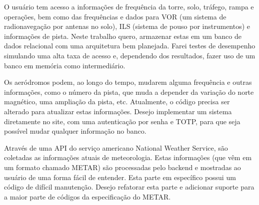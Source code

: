 O usuário tem acesso a informações de frequência da torre, solo, tráfego, rampa
e operações, bem como das frequências e dados para VOR (um sistema de radionavegação
por antenas no solo), ILS (sistema de pouso por instrumentos) e informações
de pista. Neste trabalho quero, armazenar estas
em um banco de dados relacional com uma arquitetura bem planejada. Farei testes
de desempenho simulando uma alta taxa de acesso e, dependendo dos resultados,
fazer uso de um banco em memória como intermediário. 

Os aeródromos podem, ao longo do tempo, mudarem alguma frequência e outras
informações, como o número da pista, que muda a depender da variação do norte magnético,
uma ampliação da pista, etc.
Atualmente, o código precisa ser alterado para atualizar estas informações.
Desejo implementar um sistema diretamente no site, com uma autenticação por
senha e TOTP, para que seja possível mudar qualquer informação no banco.

Através de uma API do serviço americano National Weather Service, são coletadas 
as informações atuais de meteorologia. Estas informações (que vêm em um formato
chamado METAR) são processadas pelo backend e mostradas ao usuário de uma forma 
fácil de entender. Esta parte em específico possui um código de difícil manutenção.
Desejo refatorar esta parte e adicionar suporte para a maior parte de códigos
da especificação do METAR.
